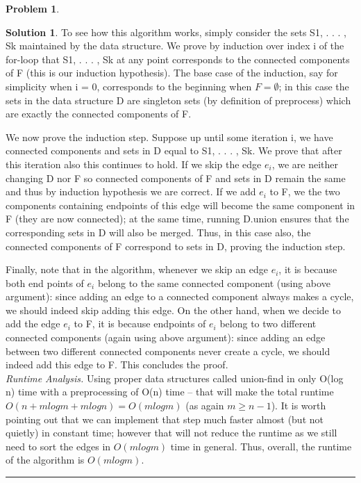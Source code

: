 \documentclass{article}
\theoremstyle{definition}
\newtheorem{problem}{Problem}
\def\fline{\rule{0.75\linewidth}{0.5pt}}
\newcommand{\finishline}{\begin{center}\fline\end{center}}
\newtheorem*{solution*}{Solution}
\newenvironment{solution}{\begin{solution*}}{{\finishline} \end{solution*}}
\begin{document}
\begin{problem}
\begin{enumerate}
\begin{solution}
	To see how this algorithm works, simply consider the sets S1, . . . , Sk maintained by the data structure. We prove by induction over index i of the for-loop that S1, . . . , Sk at any point corresponds to the connected components of F (this is our induction hypothesis). The base case of the induction, say for simplicity when i = 0, corresponds to the beginning when $F = \emptyset$; in this case the sets in the data structure D are singleton sets (by definition of preprocess) which are exactly the connected components of F. 
	
	We now prove the induction step. Suppose up until some iteration i, we have connected components and sets in D equal to S1, . . . , Sk. We prove that after this iteration also this continues to hold. If we skip the edge $e_i$, we are neither changing D nor F so connected components of F and sets in D remain the same and thus by induction hypothesis we are correct. If we add $e_i$ to F, we the two components containing endpoints of this edge will become the same component in F (they are now connected); at the same time, running D.union ensures that the corresponding sets in D will also be merged. Thus, in this case also, the connected components of F correspond to sets in D, proving the induction step. 
	
	Finally, note that in the algorithm, whenever we skip an edge $e_i$, it is because both end points of $e_i$ belong to the same connected component (using above argument): since adding an edge to a connected component always makes a cycle, we should indeed skip adding this edge. On the other hand, when we decide to add the edge $e_i$ to F, it is because endpoints of $e_i$ belong to two different connected components (again using above argument): since adding an edge between two different connected components never create a cycle, we should indeed add this edge to F. This concludes the proof. \\
	
	\emph{Runtime Analysis.} Using proper data structures called union-find in only O(log n) time with a preprocessing of O(n) time – that will make the total runtime $O(n+m log m+m log n) = O(m log m)$ (as again $m \geq n-1$). It is worth pointing out that we can implement that step much faster almost (but not quietly) in constant time; however that will not reduce the runtime as we still need to sort the edges in $O(m log m)$ time in general.
Thus, overall, the runtime of the algorithm is $O(m log m)$. \\
 


\end{solution}
\end{enumerate}
\end{problem}
\end{document}
